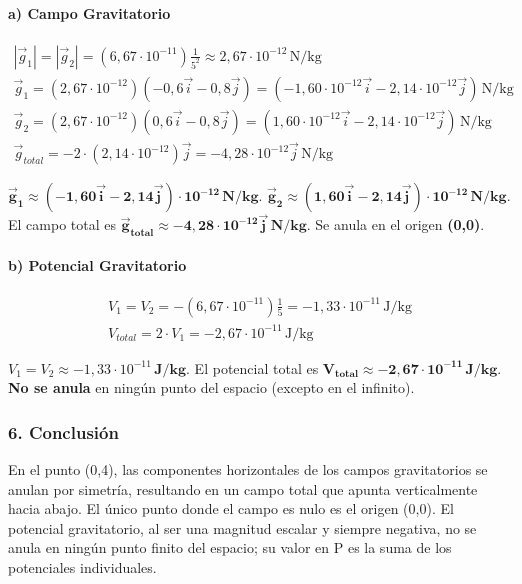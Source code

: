 \paragraph*{a) Campo Gravitatorio}
\begin{gather}
    |\vec{g}_1| = |\vec{g}_2| = (6,67\cdot10^{-11})\frac{1}{5^2} \approx 2,67\cdot10^{-12}\,\text{N/kg} \\
    \vec{g}_1 = (2,67\cdot10^{-12})(-0,6\vec{i}-0,8\vec{j}) = (-1,60\cdot10^{-12}\vec{i} - 2,14\cdot10^{-12}\vec{j})\,\text{N/kg} \\
    \vec{g}_2 = (2,67\cdot10^{-12})(0,6\vec{i}-0,8\vec{j}) = (1,60\cdot10^{-12}\vec{i} - 2,14\cdot10^{-12}\vec{j})\,\text{N/kg} \\
    \vec{g}_{total} = -2 \cdot (2,14\cdot10^{-12})\vec{j} = -4,28\cdot10^{-12}\vec{j}\,\text{N/kg}
\end{gather}
\begin{cajaresultado}
    $\boldsymbol{\vec{g}_1 \approx (-1,60\vec{i} - 2,14\vec{j})\cdot10^{-12}\,\textbf{N/kg}}$. $\boldsymbol{\vec{g}_2 \approx (1,60\vec{i} - 2,14\vec{j})\cdot10^{-12}\,\textbf{N/kg}}$.
    El campo total es $\boldsymbol{\vec{g}_{total} \approx -4,28\cdot10^{-12}\vec{j}\,\textbf{N/kg}}$. Se anula en el origen \textbf{(0,0)}.
\end{cajaresultado}
\paragraph*{b) Potencial Gravitatorio}
\begin{gather}
    V_1 = V_2 = -(6,67\cdot10^{-11})\frac{1}{5} = -1,33\cdot10^{-11}\,\text{J/kg} \\
    V_{total} = 2 \cdot V_1 = -2,67\cdot10^{-11}\,\text{J/kg}
\end{gather}
\begin{cajaresultado}
    $V_1 = V_2 \approx -1,33\cdot10^{-11}\,\textbf{J/kg}$. El potencial total es $\boldsymbol{V_{total} \approx -2,67\cdot10^{-11}\,\textbf{J/kg}}$. \textbf{No se anula} en ningún punto del espacio (excepto en el infinito).
\end{cajaresultado}

\subsubsection*{6. Conclusión}
\begin{cajaconclusion}
En el punto (0,4), las componentes horizontales de los campos gravitatorios se anulan por simetría, resultando en un campo total que apunta verticalmente hacia abajo. El único punto donde el campo es nulo es el origen (0,0). El potencial gravitatorio, al ser una magnitud escalar y siempre negativa, no se anula en ningún punto finito del espacio; su valor en P es la suma de los potenciales individuales.
\end{cajaconclusion}

